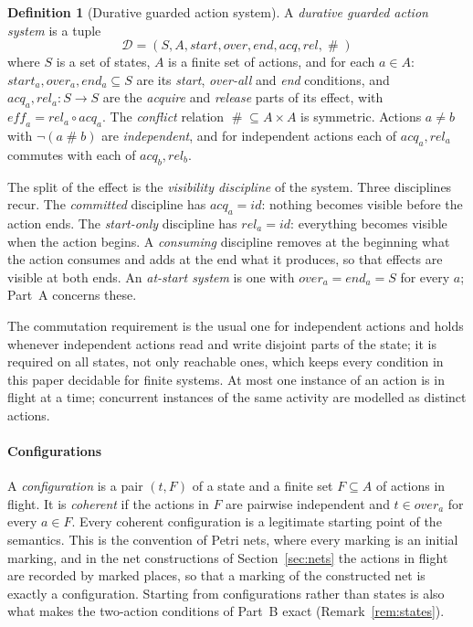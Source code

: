 \documentclass[preprint,12pt]{elsarticle}
\theoremstyle{plain}
\theoremstyle{definition}
\newtheorem{definition}[theorem]{Definition}
\newcommand{\st}{\mathit{start}}
\newcommand{\ovr}{\mathit{over}}
\newcommand{\stp}{\mathit{end}}
\newcommand{\eff}{\mathit{eff}}
\newcommand{\acq}{\mathit{acq}}
\newcommand{\rel}{\mathit{rel}}
\newcommand{\id}{\mathit{id}}
\newcommand{\conf}{\mathrel{\#}}
\newcommand{\D}{\mathcal{D}}
\begin{document}
\begin{definition}[Durative guarded action system]
\label{def:das}
A \emph{durative guarded action system} is a tuple
\[
\D = (S, A, \st, \ovr, \stp, \acq, \rel, \conf)
\]
where $S$ is a set of states, $A$ is a finite set of actions, and for each $a \in A$: $\st_a, \ovr_a, \stp_a \subseteq S$ are its \emph{start}, \emph{over-all} and \emph{end} conditions, and $\acq_a, \rel_a : S \to S$ are the \emph{acquire} and \emph{release} parts of its effect, with $\eff_a = \rel_a \circ \acq_a$. The \emph{conflict} relation ${\conf} \subseteq A \times A$ is symmetric. Actions $a \neq b$ with $\neg (a \conf b)$ are \emph{independent}, and for independent actions each of $\acq_a, \rel_a$ commutes with each of $\acq_b, \rel_b$.
\end{definition}

The split of the effect is the \emph{visibility discipline} of the system. Three disciplines recur. The \emph{committed} discipline has $\acq_a = \id$: nothing becomes visible before the action ends. The \emph{start-only} discipline has $\rel_a = \id$: everything becomes visible when the action begins. A \emph{consuming} discipline removes at the beginning what the action consumes and adds at the end what it produces, so that effects are visible at both ends. An \emph{at-start system} is one with $\ovr_a = \stp_a = S$ for every $a$; Part~A concerns these.

The commutation requirement is the usual one for independent actions and holds whenever independent actions read and write disjoint parts of the state; it is required on all states, not only reachable ones, which keeps every condition in this paper decidable for finite systems. At most one instance of an action is in flight at a time; concurrent instances of the same activity are modelled as distinct actions.

\paragraph{Configurations}
A \emph{configuration} is a pair $(t, F)$ of a state and a finite set $F \subseteq A$ of actions in flight. It is \emph{coherent} if the actions in $F$ are pairwise independent and $t \in \ovr_a$ for every $a \in F$. Every coherent configuration is a legitimate starting point of the semantics. This is the convention of Petri nets, where every marking is an initial marking, and in the net constructions of Section~\ref{sec:nets} the actions in flight are recorded by marked places, so that a marking of the constructed net is exactly a configuration. Starting from configurations rather than states is also what makes the two-action conditions of Part~B exact (Remark~\ref{rem:states}).
\end{document}
